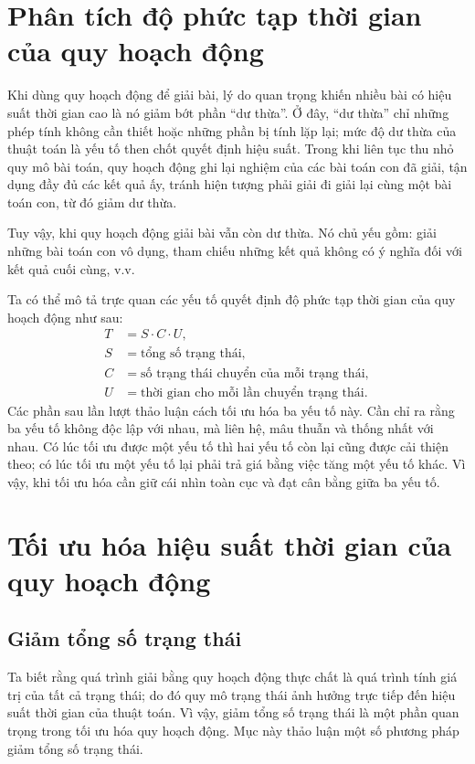 \documentclass[11pt]{article}
\begin{document}
\section{Phân tích độ phức tạp thời gian của quy hoạch động}

Khi dùng quy hoạch động để giải bài, lý do quan trọng khiến nhiều bài có hiệu
suất thời gian cao là nó giảm bớt phần ``dư thừa''. Ở đây, ``dư thừa'' chỉ
những phép tính không cần thiết hoặc những phần bị tính lặp lại; mức độ dư
thừa của thuật toán là yếu tố then chốt quyết định hiệu suất. Trong khi liên
tục thu nhỏ quy mô bài toán, quy hoạch động ghi lại nghiệm của các bài toán
con đã giải, tận dụng đầy đủ các kết quả ấy, tránh hiện tượng phải giải đi
giải lại cùng một bài toán con, từ đó giảm dư thừa.

Tuy vậy, khi quy hoạch động giải bài vẫn còn dư thừa. Nó chủ yếu gồm: giải
những bài toán con vô dụng, tham chiếu những kết quả không có ý nghĩa đối với
kết quả cuối cùng, v.v.

Ta có thể mô tả trực quan các yếu tố quyết định độ phức tạp thời gian của quy
hoạch động như sau:
\[
\begin{aligned}
T &= S\cdot C\cdot U,\\
S &= \text{tổng số trạng thái},\\
C &= \text{số trạng thái chuyển của mỗi trạng thái},\\
U &= \text{thời gian cho mỗi lần chuyển trạng thái}.
\end{aligned}
\]
Các phần sau lần lượt thảo luận cách tối ưu hóa ba yếu tố này. Cần chỉ ra
rằng ba yếu tố không độc lập với nhau, mà liên hệ, mâu thuẫn và thống nhất
với nhau. Có lúc tối ưu được một yếu tố thì hai yếu tố còn lại cũng được cải
thiện theo; có lúc tối ưu một yếu tố lại phải trả giá bằng việc tăng một yếu
tố khác. Vì vậy, khi tối ưu hóa cần giữ cái nhìn toàn cục và đạt cân bằng
giữa ba yếu tố.

\section{Tối ưu hóa hiệu suất thời gian của quy hoạch động}

\subsection{Giảm tổng số trạng thái}

Ta biết rằng quá trình giải bằng quy hoạch động thực chất là quá trình tính
giá trị của tất cả trạng thái; do đó quy mô trạng thái ảnh hưởng trực tiếp
đến hiệu suất thời gian của thuật toán. Vì vậy, giảm tổng số trạng thái là
một phần quan trọng trong tối ưu hóa quy hoạch động. Mục này thảo luận một số
phương pháp giảm tổng số trạng thái.
\end{document}
